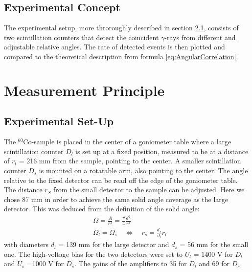 \documentclass[a4paper,parskip,11pt, DIV12]{scrreprt}
\begin{document}
\section{Experimental Concept}

		The experimental setup, more throroughly described in section \ref{sec:setup}, consists of two scintillation counters that detect the coincident $\gamma$-rays from different and adjustable relative angles. The rate of detected events is then plotted and compared to the theoretical description from formula \ref{eq:AngularCorrelation}.
		
\chapter{Measurement Principle}	

\section{Experimental Set-Up} \label{sec:setup}

		The $^{60}$Co-sample is placed in the center of a goniometer table where a large scintillation counter $D_l$ is set up at a fixed position, measured to be at a distance of $r_l$ = 216 mm from the sample, pointing to the center. A smaller scintillation counter $D_s$ is mounted on a rotatable arm, also pointing to the center. The angle relative to the fixed detector can be read off the edge of the goniometer table. The distance $r_S$ from the small detector to the sample can be adjusted. Here we chose 87 mm in order to achieve the same solid angle coverage as the large detector. This was deduced from the definition of the solid angle:\begin{eqnarray}
&\Omega  = \frac{A}{r^2} = \frac{\pi}{4} \frac{d^2}{r^2} \\
&\Omega_l = \Omega_s \quad \iff \quad r_s = \frac{d_s}{d_l} r_l
\end{eqnarray} with diameters $d_l$ = 139 mm for the large detector and $d_s$ = 56 mm for the small one. The high-voltage bias for the two detectors were set to $U_l$ = 1400 V for $D_l$ and $U_s$ =1000 V for $D_s$. The gains of the amplifiers to 35 for $D_l$ and 69 for $D_s$. 
\end{document}
